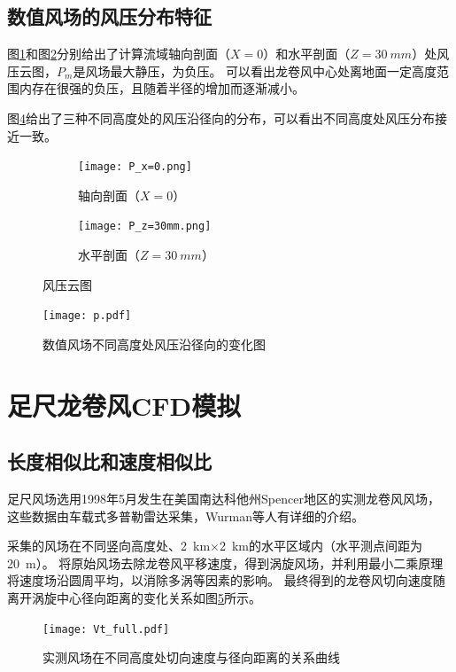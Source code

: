 \subsection{数值风场的风压分布特征}
图\ref{fig:P-x=0}和图\ref{fig:P-z=30mm}分别给出了计算流域轴向剖面（$X=0$）和水平剖面（$Z=\SI{30}{mm}$）处风压云图，$P_m$是风场最大静压，为负压。
可以看出龙卷风中心处离地面一定高度范围内存在很强的负压，且随着半径的增加而逐渐减小。

图\ref{fig:p}给出了三种不同高度处的风压沿径向的分布，可以看出不同高度处风压分布接近一致。

\begin{figure}[!htbp]
	\begin{subfigure}[b]{0.5\textwidth}
		\centering
		\texttt{[image: P\_x=0.png]}
		\caption{轴向剖面（$X=0$）}\label{fig:P-x=0}
	\end{subfigure}
	\begin{subfigure}[b]{0.5\textwidth}
		\centering
		\texttt{[image: P\_z=30mm.png]}
		\caption{水平剖面（$Z=\SI{30}{mm}$）}\label{fig:P-z=30mm}
	\end{subfigure}
	\caption{风压云图}\label{fig:p-contour}
\end{figure}

\begin{figure}[!htbp]
	\centering
	\texttt{[image: p.pdf]}
	\caption{数值风场不同高度处风压沿径向的变化图}
	\label{fig:p}
\end{figure}

\section{足尺龙卷风CFD模拟}

\subsection{长度相似比和速度相似比}

足尺风场选用1998年5月发生在美国南达科他州Spencer地区的实测龙卷风风场，
这些数据由车载式多普勒雷达采集，Wurman等人有详细的介绍\cite{wurman2002multiple}\cite{alexander2005spencer}\cite{wurman2005spencer}。

采集的风场在不同竖向高度处、\SI{2}{km}$\times$\SI{2}{km}的水平区域内（水平测点间距为\SI{20}{m}）。
将原始风场去除龙卷风平移速度，得到涡旋风场，并利用最小二乘原理将速度场沿圆周平均，以消除多涡等因素的影响。
最终得到的龙卷风切向速度随离开涡旋中心径向距离的变化关系如图\ref{fig:Vt-full}所示。
\begin{figure}[!htbp]
	\centering
	\texttt{[image: Vt\_full.pdf]}
	\caption{实测风场在不同高度处切向速度与径向距离的关系曲线\cite{sarkar2005velocity}}
	\label{fig:Vt-full}
\end{figure}

